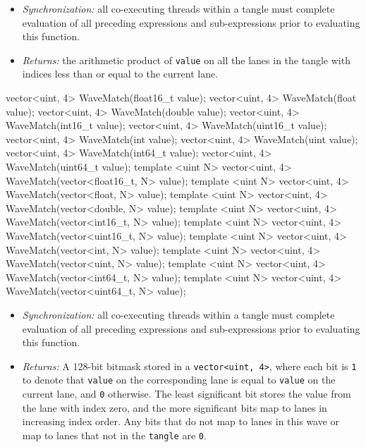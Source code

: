 \begin{itemize}
  \item \textit{Synchronization:} all co-executing threads within a \gls{tangle}
  must complete evaluation of all preceding expressions and sub-expressions
  prior to evaluating this function.
  \item \textit{Returns:} the arithmetic product of \texttt{value} on all the
  \gls{lane}s in the \gls{tangle} with indices less than or equal to the current
  \gls{lane}.
\end{itemize}

\begin{HLSL}
vector<uint, 4> WaveMatch(float16_t value);
vector<uint, 4> WaveMatch(float value);
vector<uint, 4> WaveMatch(double value);
vector<uint, 4> WaveMatch(int16_t value);
vector<uint, 4> WaveMatch(uint16_t value);
vector<uint, 4> WaveMatch(int value);
vector<uint, 4> WaveMatch(uint value);
vector<uint, 4> WaveMatch(int64_t value);
vector<uint, 4> WaveMatch(uint64_t value);
template <uint N> vector<uint, 4> WaveMatch(vector<float16_t, N> value);
template <uint N> vector<uint, 4> WaveMatch(vector<float, N> value);
template <uint N> vector<uint, 4> WaveMatch(vector<double, N> value);
template <uint N> vector<uint, 4> WaveMatch(vector<int16_t, N> value);
template <uint N> vector<uint, 4> WaveMatch(vector<uint16_t, N> value);
template <uint N> vector<uint, 4> WaveMatch(vector<int, N> value);
template <uint N> vector<uint, 4> WaveMatch(vector<uint, N> value);
template <uint N> vector<uint, 4> WaveMatch(vector<int64_t, N> value);
template <uint N> vector<uint, 4> WaveMatch(vector<uint64_t, N> value);
\end{HLSL}

\begin{itemize}
  \item \textit{Synchronization:} all co-executing threads within a \gls{tangle}
  must complete evaluation of all preceding expressions and sub-expressions
  prior to evaluating this function.
  \item \textit{Returns:} A 128-bit bitmask stored in a \texttt{vector<uint,
  4>}, where each bit is \texttt{1} to denote that \texttt{value} on the
  corresponding \gls{lane} is equal to \texttt{value} on the current lane, and
  \texttt{0} otherwise. The least significant bit stores the value from the
  \gls{lane} with index zero, and the more significant bits map to \gls{lane}s
  in increasing index order. Any bits that do not map to \gls{lane}s in this
  \gls{wave} or map to \gls{lane}s that not in the \texttt{tangle} are
  \texttt{0}.
\end{itemize}

